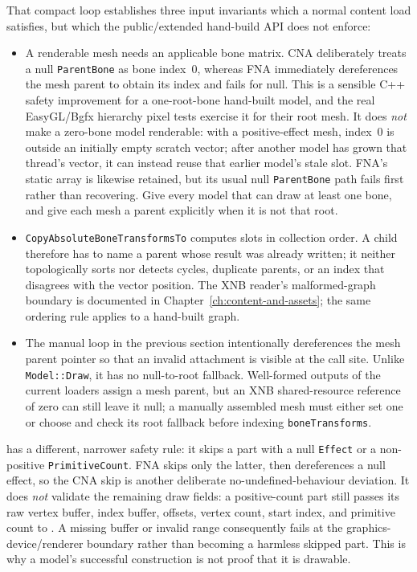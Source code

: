 That compact loop establishes three input invariants which a normal content load satisfies, but
which the public/extended hand-build API does not enforce:

\begin{itemize}
  \item A renderable mesh needs an applicable bone matrix. CNA deliberately treats a null
        \texttt{ParentBone} as bone index~0, whereas FNA immediately dereferences the mesh
        parent to obtain its index and fails for null. This is a sensible C++ safety
        improvement for a one-root-bone hand-built model, and the real EasyGL/Bgfx hierarchy
        pixel tests exercise it for their root mesh. It does \emph{not} make a zero-bone model
        renderable: with a positive-effect mesh, index~0 is outside an initially empty scratch
        vector; after another model has grown that thread's vector, it can instead reuse that
        earlier model's stale slot. FNA's static array is likewise retained, but its usual null
        \texttt{ParentBone} path fails first rather than recovering. Give every model that can
        draw at least one bone, and give each mesh a parent explicitly when it is not that root.
  \item \texttt{CopyAbsoluteBoneTransformsTo} computes slots in collection order. A child
        therefore has to name a parent whose result was already written; it neither topologically
        sorts nor detects cycles, duplicate parents, or an index that disagrees with the vector
        position. The XNB reader's malformed-graph boundary is documented in
        Chapter~\ref{ch:content-and-assets}; the same ordering rule applies to a hand-built graph.
  \item The manual loop in the previous section intentionally dereferences the mesh parent
        pointer so that an invalid attachment is visible at the call site. Unlike
        \texttt{Model::Draw}, it has no null-to-root fallback. Well-formed
        outputs of the current loaders assign a mesh parent, but an XNB shared-resource reference
        of zero can still leave it null; a manually assembled mesh must either set one or choose
        and check its root fallback before indexing \texttt{boneTransforms}.
\end{itemize}

 has a different, narrower safety rule: it skips a part with a null
\texttt{Effect} or a non-positive \texttt{PrimitiveCount}. FNA skips only the latter, then
dereferences a null effect, so the CNA skip is another deliberate no-undefined-behaviour
deviation. It does \emph{not} validate the remaining draw fields: a positive-count part still
passes its raw vertex buffer, index buffer, offsets, vertex count, start index, and primitive
count to . A missing buffer or invalid range consequently fails at the
graphics-device/renderer boundary rather than becoming a harmless skipped part. This is why a
model's successful construction is not proof that it is drawable.

